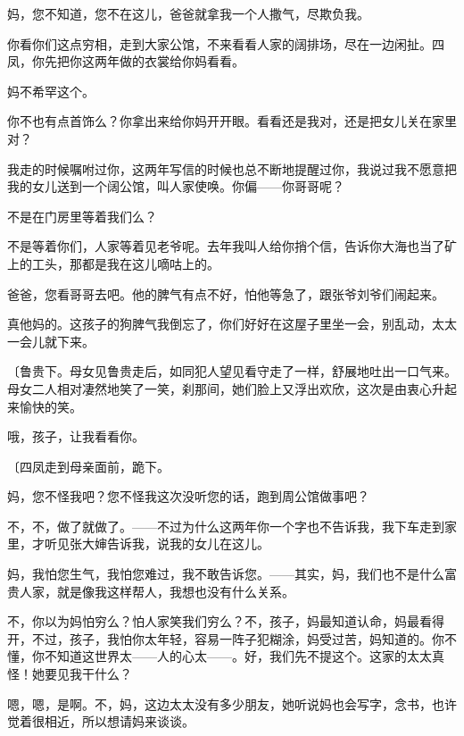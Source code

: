 妈，您不知道，您不在这儿，爸爸就拿我一个人撒气，尽欺负我。

你看你们这点穷相，走到大家公馆，不来看看人家的阔排场，尽在一边闲扯。四凤，你先把你这两年做的衣裳给你妈看看。

妈不希罕这个。

你不也有点首饰么？你拿出来给你妈开开眼。看看还是我对，还是把女儿关在家里对？

我走的时候嘱咐过你，这两年写信的时候也总不断地提醒过你，我说过我不愿意把我的女儿送到一个阔公馆，叫人家使唤。你偏——你哥哥呢？

不是在门房里等着我们么？

不是等着你们，人家等着见老爷呢。去年我叫人给你捎个信，告诉你大海也当了矿上的工头，那都是我在这儿嘀咕上的。

爸爸，您看哥哥去吧。他的脾气有点不好，怕他等急了，跟张爷刘爷们闹起来。

真他妈的。这孩子的狗脾气我倒忘了，你们好好在这屋子里坐一会，别乱动，太太一会儿就下来。

{\fangsong〔鲁贵下。母女见鲁贵走后，如同犯人望见看守走了一样，舒展地吐出一口气来。母女二人相对凄然地笑了一笑，刹那间，她们脸上又浮出欢欣，这次是由衷心升起来愉快的笑。}

哦，孩子，让我看看你。

{\fangsong〔四凤走到母亲面前，跪下。}

妈，您不怪我吧？您不怪我这次没听您的话，跑到周公馆做事吧？

不，不，做了就做了。——不过为什么这两年你一个字也不告诉我，我下车走到家里，才听见张大婶告诉我，说我的女儿在这儿。

妈，我怕您生气，我怕您难过，我不敢告诉您。——其实，妈，我们也不是什么富贵人家，就是像我这样帮人，我想也没有什么关系。

不，你以为妈怕穷么？怕人家笑我们穷么？不，孩子，妈最知道认命，妈最看得开，不过，孩子，我怕你太年轻，容易一阵子犯糊涂，妈受过苦，妈知道的。你不懂，你不知道这世界太——人的心太——。好，我们先不提这个。这家的太太真怪！她要见我干什么？

嗯，嗯，是啊。不，妈，这边太太没有多少朋友，她听说妈也会写字，念书，也许觉着很相近，所以想请妈来谈谈。

